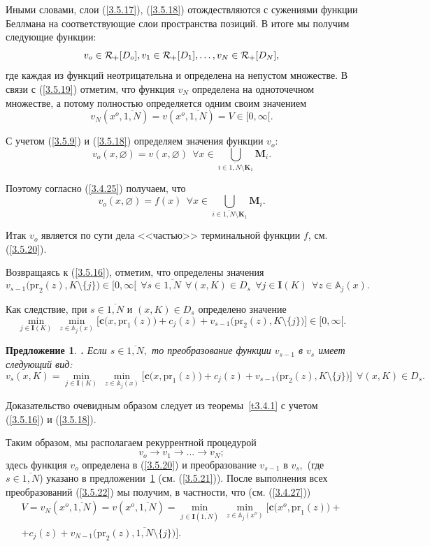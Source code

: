 \documentclass[11pt,twoside,openany]{report}
\newcommand{\bfn}{\begin{equation}}
\newcommand{\efn}{\end{equation}}
\newcommand{\ov}{\overline}
\newcounter{theo}
\newcounter{pred}
\newtheorem{pred}{Предложение}[section]
\newcommand{\TL}{\mbox{\bf{$\!\!$.}}}
\newcommand{\sm}{\setminus}
\newcommand{\fa}{\forall}
\newcommand{\clr}{{\cal R}}
\newcommand{\bba}{{\mathbb A}}
\newcommand{\emp}{\varnothing}
\begin{document}
{Иными словами,
слои (\ref{3.5.17}), (\ref{3.5.18}) отождествляются с сужениями  функции
Беллмана на соответствующие слои пространства позиций.
В итоге мы получим следующие функции:
\bfn
  \label{3.5.19}
  v_o\in \clr_+[D_o], v_1\in \clr_+[D_1],\ldots,v_N\in \clr_+[D_N]
  ,
\efn
где каждая из функций неотрицательна и определена на непустом множестве.
В связи с (\ref{3.5.19}) отметим,
что функция $v_N$ определена на одноточечном множестве,
а потому полностью определяется одним своим значением
$$
  v_N(x^o,\ov{1,N})= v(x^o,\ov{1,N}) = V\in [0,\infty[
  .
$$

С учетом (\ref{3.5.9}) и (\ref{3.5.18})
определяем значения функции $v_o$:
$$
  v_o(x,\emp) = v(x,\emp)\ \ \fa x\in \bigcup\limits_{i\in \ov{1,N}\sm \mathbf{K}_1}\mathbf{M}_i
  .
$$

Поэтому согласно (\ref{3.4.25}) получаем, что
\bfn
  \label{3.5.20}
  v_o(x,\emp) = f(x)\ \ \fa x\in \bigcup\limits_{i\in \ov{1,N}\sm
  \mathbf{K}_1}\mathbf{M}_i
  .
\efn

Итак
$v_o$ является  по сути дела <<частью>> терминальной функции $f$,
см. (\ref{3.5.20}).

Возвращаясь к (\ref{3.5.16}),
отметим, что определены значения
$$
  v_{s-1}\bigl(\mathrm{pr}_2(z),K\sm\{j\}\bigl)\in [0,\infty[\ \ \fa s \in \ov{1,N}\ \ \fa
  (x,K)\in D_s\ \ \fa j\in \mathbf{I}(K)\ \ \fa z\in \bba_j(x)
  .
$$

Как следствие,
при $s\in \ov{1,N}$ и $(x,K)\in D_s$
определено значение
$$
  \min\limits_{j\in\mathbf{I}(K)}\ \min\limits_{z\in \bba_j(x)}\bigl[\mathbf{c}\bigl(x,
  \mathrm{pr}_1(z)\bigl) + c_j(z) + v_{s-1}\bigl(\mathrm{pr}_2(z),K\sm\{j\}\bigl)\bigl]\in [0,\infty[
  .
$$

\begin{pred}
  \label{p3.5.1}{\TL}
Если $s\in \ov{1,N},$ то преобразование функции
$v_{s-1}$ в $v_s$
имеет следующий вид:
\bfn
  \label{3.5.21}
  v_s(x,K) = \min\limits_{j\in \mathbf{I}(K)}\ \min\limits_{z\in \bba_j(x)}
  \bigl[\mathbf{c}\bigl(x,\mathrm{pr}_1(z)\bigl) + c_j(z) + v_{s-1}\bigl(\mathrm{pr}_2(z),
  K\sm\{j\}\bigl)\bigl]\ \ \fa (x,K) \in D_s
  .
\efn
\end{pred}

Доказательство очевидным образом следует из теоремы~\ref{t3.4.1}
с учетом
(\ref{3.5.16}) и (\ref{3.5.18}).

Таким образом, мы располагаем рекуррентной процедурой
\bfn
  \label{3.5.22}
  v_o \longrightarrow v_1 \longrightarrow \ldots \longrightarrow v_N
  ;
\efn
здесь функция $v_o$ определена в (\ref{3.5.20})
и преобразование $v_{s-1}$ в $v_s,$
(где $s\in \ov{1,N}$)
указано в предложении~\ref{p3.5.1} (см. (\ref{3.5.21})).
После выполнения всех преобразований (\ref{3.5.22})
мы получим, в частности, что (см. (\ref{3.4.27}))
\begin{eqnarray}
  &V = v_N(x^o,\ov{1,N}) = v(x^o,\ov{1,N}) =
  \min\limits_{j\in \mathbf{I}(\overline{1,N})}\
  \min\limits_{z\in \bba_j(x^o)} \bigl[\mathbf{c}\bigl(x^o,\mathrm{pr}_1(z)\bigl) +
  &\nonumber\\
  &+c_j(z) +
  v_{N-1}\bigl(\mathrm{pr}_2(z),\ov{1,N}\sm\{j\}\bigl)\bigl]
  .
  \label{3.5.23}
\end{eqnarray}

}
\end{document}
